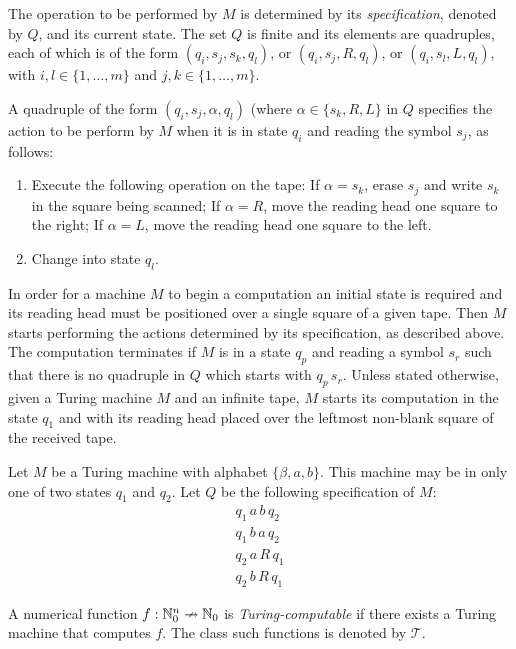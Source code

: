 The operation to be performed by $M$ is determined by its \emph{specification}, denoted by $Q$, and its current state. The set $Q$ is finite and its elements are quadruples, each of which is of the form $(q_i, s_j, s_k, q_l)$, or $(q_i, s_j, R, q_l)$, or $(q_i, s_l, L, q_l)$, with $i,l \in \{ 1, \ldots, m \}$ and $j,k \in \{ 1, \ldots, m \}$. \par
A quadruple of the form $(q_i, s_j, \alpha, q_l)$ (where $\alpha \in \{ s_k , R, L \}$ in $Q$ specifies the action to be perform by $M$ when it is in state $q_i$ and reading the symbol $s_j$, as follows:
\begin{enumerate}
	\item Execute the following operation on the tape:
		\subitem If $\alpha = s_k$, erase $s_j$ and write $s_k$ in the square being scanned;
		\subitem If $\alpha = R$, move the reading head one square to the right;
		\subitem If $\alpha = L$, move the reading head one square to the left.
	\item Change into state $q_l$.
\end{enumerate}
In order for a machine $M$ to begin a computation an initial state is required and its reading head must be positioned over a single square of a given tape. Then $M$ starts performing the actions determined by its specification, as described above. The computation terminates if $M$ is in a state $q_p$ and reading a symbol $s_r$ such that there is no quadruple in $Q$ which starts with $q_p \, s_r$. Unless stated otherwise, given a Turing machine $M$ and an infinite tape, $M$ starts its computation in the state $q_1$ and with its reading head placed over the leftmost non-blank square of the received tape.

\begin{example}
	Let $M$ be a Turing machine with alphabet $\{ \beta, a , b \}$. This machine may be in only one of two states $q_1$ and $q_2$. Let $Q$ be the following specification of $M$:
	\begin{gather*}	
	q_1 \, a \, b \, q_2 \\
	q_1 \, b \, a \, q_2 \\
	q_2 \, a \, R \, q_1 \\
	q_2 \, b \, R \, q_1
	\end{gather*}
\end{example}

A numerical function $f: \mathbb{N}_0^n \nrightarrow \mathbb{N}_0$ is \emph{Turing-computable} if there exists a Turing machine that computes $f$. The class such functions is denoted by $\mathcal{T}$.


